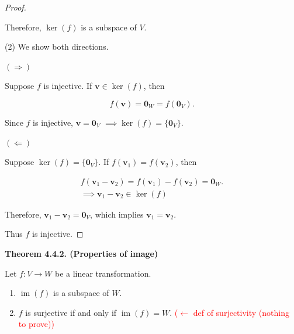 \documentclass[12pt]{article}
\begin{document}
\begin{proof}
\begin{itemize}
\end{itemize}

Therefore, $\operatorname{ker}(f)$ is a subspace of $V$.

\medskip

(2) We show both directions.

$(\Rightarrow)$

Suppose $f$ is injective. If $\mathbf{v}\in\operatorname{ker}(f)$, then

\[
f(\mathbf{v})=\mathbf{0}_W=f(\mathbf{0}_V).
\]

Since $f$ is injective, $\mathbf{v}=\mathbf{0}_V$ $\implies \operatorname{ker}(f) = \{\mathbf{0}_V\}$.

$(\Leftarrow)$

Suppose $\operatorname{ker}(f)=\{\mathbf{0}_V\}$. If $f(\mathbf{v}_1)=f(\mathbf{v}_2)$, then

\[
\begin{aligned}
f(\mathbf{v}_1-\mathbf{v}_2)= f(\mathbf{v}_1)-f(\mathbf{v}_2)=\mathbf{0}_W.\\
\implies \mathbf{v}_1-\mathbf{v}_2 \in \ker(f)   
\end{aligned}
\]

Therefore, $\mathbf{v}_1-\mathbf{v}_2=\mathbf{0}_V$, which implies $\mathbf{v}_1=\mathbf{v}_2$.

Thus $f$ is injective.

\end{proof}

\textbf{Theorem 4.4.2. (Properties of image)}

Let $f:V\rightarrow W$ be a linear transformation.

\begin{enumerate}
    \item $\operatorname{im}(f)$ is a subspace of $W$.

    \item $f$ is surjective if and only if $\operatorname{im}(f)=W$. \textcolor{red}{($\leftarrow$ def of surjectivity (nothing to prove))}
\end{enumerate}
\end{document}
